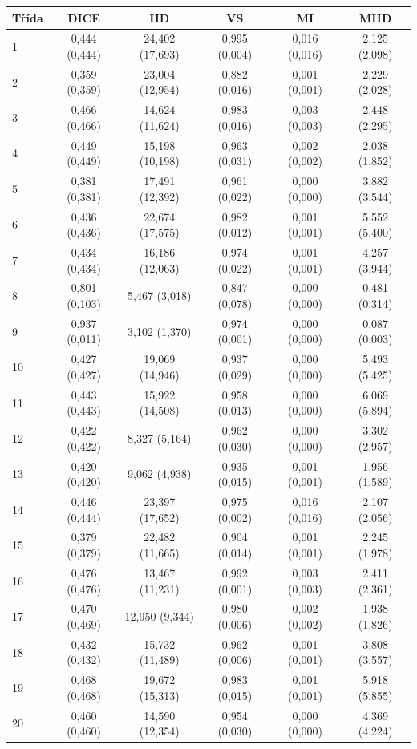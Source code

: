 \begin{tabular}{l c c c c c}
 \hline
Třída & DICE & HD & VS & MI & MHD \\ \hline
1 & 0,444 (0,444) & 24,402 (17,693) & 0,995 (0,004) & 0,016 (0,016) & 2,125 (2,098) \\
2 & 0,359 (0,359) & 23,004 (12,954) & 0,882 (0,016) & 0,001 (0,001) & 2,229 (2,028) \\
3 & 0,466 (0,466) & 14,624 (11,624) & 0,983 (0,016) & 0,003 (0,003) & 2,448 (2,295) \\
4 & 0,449 (0,449) & 15,198 (10,198) & 0,963 (0,031) & 0,002 (0,002) & 2,038 (1,852) \\
5 & 0,381 (0,381) & 17,491 (12,392) & 0,961 (0,022) & 0,000 (0,000) & 3,882 (3,544) \\
6 & 0,436 (0,436) & 22,674 (17,575) & 0,982 (0,012) & 0,001 (0,001) & 5,552 (5,400) \\
7 & 0,434 (0,434) & 16,186 (12,063) & 0,974 (0,022) & 0,001 (0,001) & 4,257 (3,944) \\
8 & 0,801 (0,103) & 5,467 (3,018) & 0,847 (0,078) & 0,000 (0,000) & 0,481 (0,314) \\
9 & 0,937 (0,011) & 3,102 (1,370) & 0,974 (0,001) & 0,000 (0,000) & 0,087 (0,003) \\
10 & 0,427 (0,427) & 19,069 (14,946) & 0,937 (0,029) & 0,000 (0,000) & 5,493 (5,425) \\
11 & 0,443 (0,443) & 15,922 (14,508) & 0,958 (0,013) & 0,000 (0,000) & 6,069 (5,894) \\
12 & 0,422 (0,422) & 8,327 (5,164) & 0,962 (0,030) & 0,000 (0,000) & 3,302 (2,957) \\
13 & 0,420 (0,420) & 9,062 (4,938) & 0,935 (0,015) & 0,001 (0,001) & 1,956 (1,589) \\
14 & 0,446 (0,444) & 23,397 (17,652) & 0,975 (0,002) & 0,016 (0,016) & 2,107 (2,056) \\
15 & 0,379 (0,379) & 22,482 (11,665) & 0,904 (0,014) & 0,001 (0,001) & 2,245 (1,978) \\
16 & 0,476 (0,476) & 13,467 (11,231) & 0,992 (0,001) & 0,003 (0,003) & 2,411 (2,361) \\
17 & 0,470 (0,469) & 12,950 (9,344) & 0,980 (0,006) & 0,002 (0,002) & 1,938 (1,826) \\
18 & 0,432 (0,432) & 15,732 (11,489) & 0,962 (0,006) & 0,001 (0,001) & 3,808 (3,557) \\
19 & 0,468 (0,468) & 19,672 (15,313) & 0,983 (0,015) & 0,001 (0,001) & 5,918 (5,855) \\
20 & 0,460 (0,460) & 14,590 (12,354) & 0,954 (0,030) & 0,000 (0,000) & 4,369 (4,224) \\

\end{tabular}

